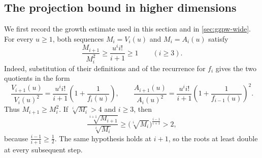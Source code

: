 \documentclass[reqno, 11pt]{article}
\numberwithin{equation}{section}
\theoremstyle{definition}
\begin{document}
\subsection{The projection bound in higher dimensions}

We first record the growth estimate used in this section and in
\cref{sec:gzpw-wide}. For every $u\ge1$, both sequences $M_i=V_i(u)$
and $M_i=A_i(u)$ satisfy
\begin{equation}\label{eq:volume-scale-growth}
 \frac{M_{i+1}}{M_i^2}\ge\frac{u^i i!}{i+1}\ge1\qquad(i\ge3).
\end{equation}
Indeed, substitution of their definitions and of the recurrence for
$f_i$ gives the two quotients in the form
\[
 \frac{V_{i+1}(u)}{V_i(u)^2}=\frac{u^i i!}{i+1}
                 \left(1+\frac{1}{f_i(u)}\right),\qquad
 \frac{A_{i+1}(u)}{A_i(u)^2}=\frac{u^i i!}{i+1}
                 \left(1+\frac{1}{f_{i-1}(u)}\right)^2 .
\]
Thus $M_{i+1}\ge M_i^2$. If $\sqrt[i]{M_i}>4$ and $i\ge3$, then
\[
 \frac{\sqrt[i+1]{M_{i+1}}}{\sqrt[i]{M_i}}
     \ge\bigl(\sqrt[i]{M_i}\bigr)^{\frac{i-1}{i+1}}>2,
\]
because $\frac{i-1}{i+1}\ge\frac{1}{2}$. The same hypothesis holds
at $i+1$, so the roots at least double at every subsequent step.
\end{document}
